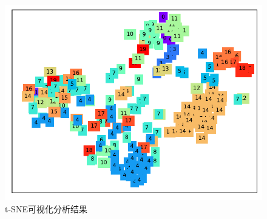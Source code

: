 \begin{figure}[htbp]
    \centering
    \includegraphics[width=.6\textwidth]{figs/visualization.pdf}
    \caption{t-SNE可视化分析结果}
    \label{fig:visualization}
\end{figure}
